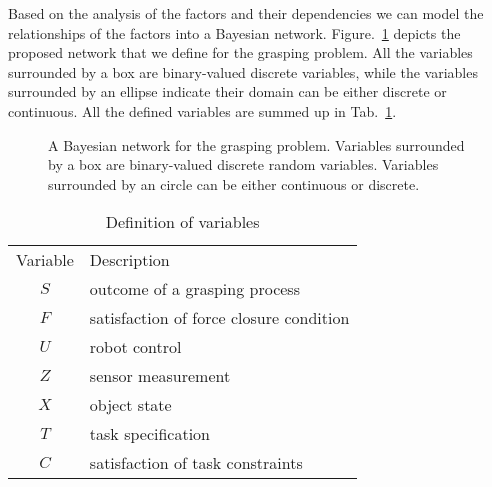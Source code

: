 Based on the analysis of the factors and their dependencies we can model the  relationships of the factors into a Bayesian network. Figure.~\ref{fig:bnet} depicts the proposed network that we define for the grasping problem. All the variables surrounded by a box are binary-valued discrete variables, while the variables surrounded by an ellipse indicate their domain can be either discrete or continuous. All the defined variables are summed up in Tab.~\ref{tab:random_variable}.

\begin{figure}[!htbp]
\centering
%
\resizebox{.5\textwidth}{!}{}
\captionsetup{justification=raggedright}
\caption{A Bayesian network for the grasping problem. Variables surrounded by a box are binary-valued discrete random variables. Variables surrounded by an circle can be either continuous or discrete.}
\label{fig:bnet}
\end{figure}	

\begin{table}[!htbp]
\centering
\begin{tabular}{cl}
Variable & Description                              \\
$S$      & outcome of a grasping process            \\
$F$      & satisfaction of force closure condition \\
$U$      & robot control                            \\
$Z$      & sensor measurement                       \\
$X$      & object state                             \\
$T$      & task specification                       \\
$C$      & satisfaction of task constraints       
\end{tabular}
\caption{Definition of variables }
\label{tab:random_variable}
\end{table}

